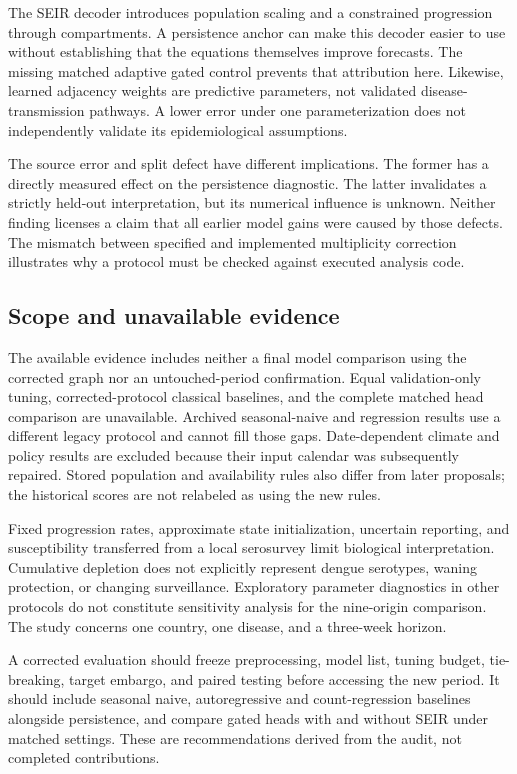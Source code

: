 \documentclass[conference]{IEEEtran}
\begin{document}
The SEIR decoder introduces population scaling and a constrained progression through compartments.
A persistence anchor can make this decoder easier to use without establishing that the equations themselves improve forecasts.
The missing matched adaptive gated control prevents that attribution here.
Likewise, learned adjacency weights are predictive parameters, not validated disease-transmission pathways.
A lower error under one parameterization does not independently validate its epidemiological assumptions.

The source error and split defect have different implications.
The former has a directly measured effect on the persistence diagnostic.
The latter invalidates a strictly held-out interpretation, but its numerical influence is unknown.
Neither finding licenses a claim that all earlier model gains were caused by those defects.
The mismatch between specified and implemented multiplicity correction illustrates why a protocol must be checked against executed analysis code.

\subsection{Scope and unavailable evidence}
The available evidence includes neither a final model comparison using the corrected graph nor an untouched-period confirmation.
Equal validation-only tuning, corrected-protocol classical baselines, and the complete matched head comparison are unavailable.
Archived seasonal-naive and regression results use a different legacy protocol and cannot fill those gaps.
Date-dependent climate and policy results are excluded because their input calendar was subsequently repaired.
Stored population and availability rules also differ from later proposals; the historical scores are not relabeled as using the new rules.

Fixed progression rates, approximate state initialization, uncertain reporting, and susceptibility transferred from a local serosurvey limit biological interpretation.
Cumulative depletion does not explicitly represent dengue serotypes, waning protection, or changing surveillance.
Exploratory parameter diagnostics in other protocols do not constitute sensitivity analysis for the nine-origin comparison.
The study concerns one country, one disease, and a three-week horizon. %

A corrected evaluation should freeze preprocessing, model list, tuning budget, tie-breaking, target embargo, and paired testing before accessing the new period.
It should include seasonal naive, autoregressive and count-regression baselines alongside persistence, and compare gated heads with and without SEIR under matched settings.
These are recommendations derived from the audit, not completed contributions.
\end{document}
